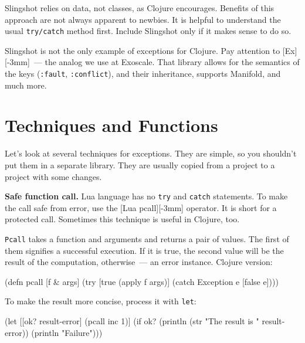 \fi

Slingshot relies on data, not classes, as Clojure encourages. Benefits of this approach are not always apparent to newbies. It is helpful to understand the usual \verb|try/catch| method first. Include Slingshot only if it makes sense to do so.


Slingshot is not the only example of exceptions for Clojure. Pay attention to [Ex][-3mm]~--- the analog we use at Exoscale.
That library allows for the semantics of the keys (\verb|:fault|, \verb|:conflict|), and their inheritance, supports Manifold, and much more.

\section{ Techniques and Functions }

Let's look at several techniques for exceptions. They are simple, so you shouldn't put them in a separate library. They are usually copied from a project to a project with some changes.


\label{pcall}

\textbf{Safe function call.} Lua language has no \verb|try| and \verb|catch| statements. To make the call safe from error, use the [Lua pcall][-3mm] operator. It is short for a protected call. Sometimes this technique is useful in Clojure, too.

\verb|Pcall| takes a function and arguments and returns a pair of values. The first of them signifies a successful execution. If it is true, the second value will be the result of the computation, otherwise~--- an error instance. Clojure version:


\begin{clojure}
(defn pcall [f & args]
  (try
    [true (apply f args)]
    (catch Exception e [false e])))
\end{clojure}

To make the result more concise, process it with \verb|let|:

\ifx\DEVICETYPE\MOBILE

\begin{clojure}
(let [[ok? result-error] (pcall inc 1)]
  (if ok?
    (println
      (str "The result is "
        result-error))
    (println "Failure")))
\end{clojure}

